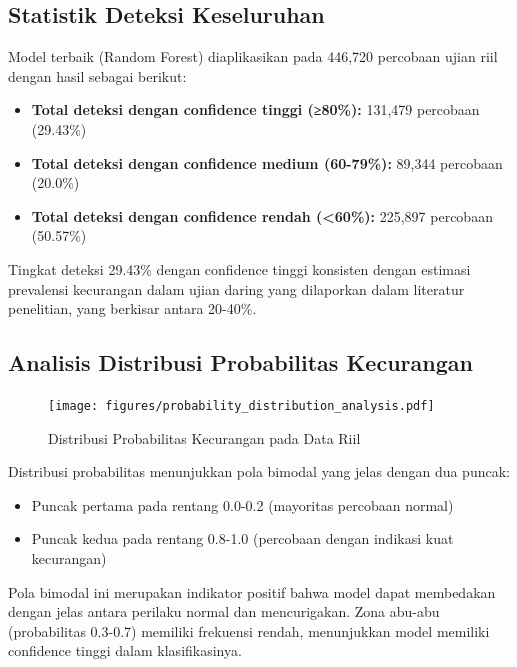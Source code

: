 \subsection{Statistik Deteksi Keseluruhan}
\label{subsec:statistikDeteksiKeseluruhan}

Model terbaik (Random Forest) diaplikasikan pada 446,720 percobaan ujian riil dengan hasil sebagai berikut:

\begin{itemize}
    \item \textbf{Total deteksi dengan confidence tinggi (≥80\%):} 131,479 percobaan (29.43\%)
    \item \textbf{Total deteksi dengan confidence medium (60-79\%):} 89,344 percobaan (20.0\%)
    \item \textbf{Total deteksi dengan confidence rendah (<60\%):} 225,897 percobaan (50.57\%)
\end{itemize}

Tingkat deteksi 29.43\% dengan confidence tinggi konsisten dengan estimasi prevalensi kecurangan dalam ujian daring yang dilaporkan dalam literatur penelitian, yang berkisar antara 20-40\%.

\subsection{Analisis Distribusi Probabilitas Kecurangan}
\label{subsec:analisisDistribusiProbabilitas}

\begin{figure}[htbp]
    \centering
    \texttt{[image: figures/probability\_distribution\_analysis.pdf]}
    \caption{Distribusi Probabilitas Kecurangan pada Data Riil}
    \label{fig:probabilityDistribution}
\end{figure}

Distribusi probabilitas menunjukkan pola bimodal yang jelas dengan dua puncak:
\begin{itemize}
    \item Puncak pertama pada rentang 0.0-0.2 (mayoritas percobaan normal)
    \item Puncak kedua pada rentang 0.8-1.0 (percobaan dengan indikasi kuat kecurangan)
\end{itemize}

Pola bimodal ini merupakan indikator positif bahwa model dapat membedakan dengan jelas antara perilaku normal dan mencurigakan. Zona abu-abu (probabilitas 0.3-0.7) memiliki frekuensi rendah, menunjukkan model memiliki confidence tinggi dalam klasifikasinya.

